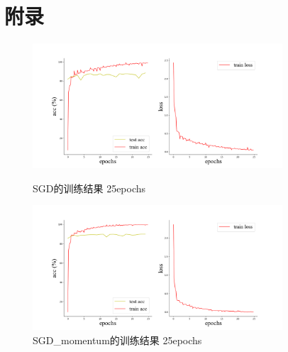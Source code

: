 \documentclass[10.5pt,a4paper]{article}%
\begin{document}
\section{附录}
            \begin{figure}[H]
                    \centering
        	\begin{minipage}{0.48\textwidth}
        		\centering
        		\includegraphics[width=0.83\textwidth]{imgs_25e/SGD.png}
        		\caption{\fontsize{10pt}{15pt}\selectfont SGD的训练结果 25epochs}
        	\end{minipage}
        	\hspace{0cm}%
        	\hfill%
        	\begin{minipage}{0.48\textwidth}
        		\centering
        		\includegraphics[width=0.83\textwidth]{imgs_25e/SGD_momentum.png}
        		\caption{\fontsize{10pt}{15pt}\selectfont SGD\_momentum的训练结果 25epochs}
        	\end{minipage}
            \end{figure}    
\end{document}
